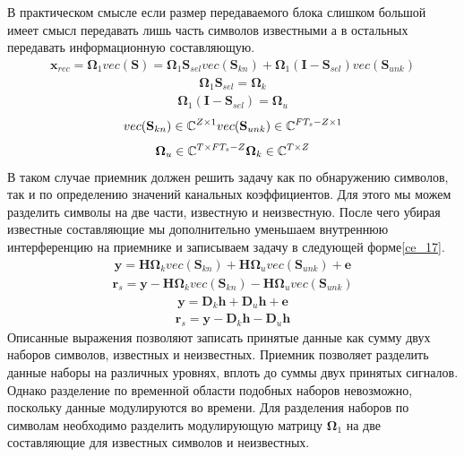 В практическом смысле если размер передаваемого блока слишком большой имеет смысл передавать лишь часть символов известными а в остальных передавать информационную составляющую. 
 \begin{align}
 \mathbf{x}_{rec}=\mathbf{\Omega}_1vec(\mathbf{S})=\mathbf{\Omega}_1 \mathbf{S}_{sel}vec(\mathbf{S}_{kn})+\mathbf{\Omega}_1(\mathbf{I}-\mathbf{S}_{sel})vec(\mathbf{S}_{unk})
 \label{ce_8}
\end{align}
\begin{align}
\mathbf{\Omega}_1 \mathbf{S}_{sel}=\mathbf{\Omega}_k
\label{ce_9}
\end{align}
\begin{align}
\mathbf{\Omega}_1 (\mathbf{I}-\mathbf{S}_{sel})=\mathbf{\Omega}_u
\label{ce_10}
\end{align}
\begin{align}
vec(\mathbf{S}_{kn})\in \mathbb{C}^{Z\times 1} vec(\mathbf{S}_{unk})\in \mathbb{C}^{FT_s-Z\times 1}
\label{ce_11}
\end{align}
\begin{align}
\mathbf{\Omega}_u \in\mathbb{C}^{T\times FT_s-Z} \mathbf{\Omega}_k \in\mathbb{C}^{T\times Z}
\label{ce_12}
\end{align}
В таком случае приемник должен решить задачу как по обнаружению символов, так и по определению значений канальных коэффициентов. Для этого мы можем разделить символы на две части, известную и неизвестную. После чего убирая известные составляющие мы дополнительно уменьшаем внутреннюю интерференцию на приемнике и записываем задачу в следующей форме\eqref{ce_17}.
 \begin{align}
\mathbf{y}=\mathbf{H}\mathbf{\Omega}_kvec(\mathbf{S}_{kn})+\mathbf{H}\mathbf{\Omega}_uvec(\mathbf{S}_{unk})+\mathbf{e}
\label{ce_13}
\end{align}
\begin{align}
\mathbf{r}_s=\mathbf{y}-\mathbf{H}\mathbf{\Omega}_kvec(\mathbf{S}_{kn})-\mathbf{H}\mathbf{\Omega}_uvec(\mathbf{S}_{unk})
\label{ce_14}
\end{align}
\begin{align}
\mathbf{y}=\mathbf{D}_k\mathbf{h}+\mathbf{D}_u\mathbf{h}+\mathbf{e}
\label{ce_15}
\end{align}
\begin{align}
\mathbf{r}_s=\mathbf{y}-\mathbf{D}_k\mathbf{h}-\mathbf{D}_u\mathbf{h}
\label{ce_17}
\end{align}
Описанные выражения позволяют записать принятые данные как сумму двух наборов символов, известных и неизвестных. Приемник позволяет разделить данные наборы на различных уровнях, вплоть до суммы двух принятых сигналов. Однако разделение по временной области подобных наборов невозможно, поскольку данные модулируются во времени. Для разделения наборов по символам необходимо разделить модулирующую матрицу $\mathbf{\Omega}_1$ на две составляющие для известных символов и неизвестных. 
